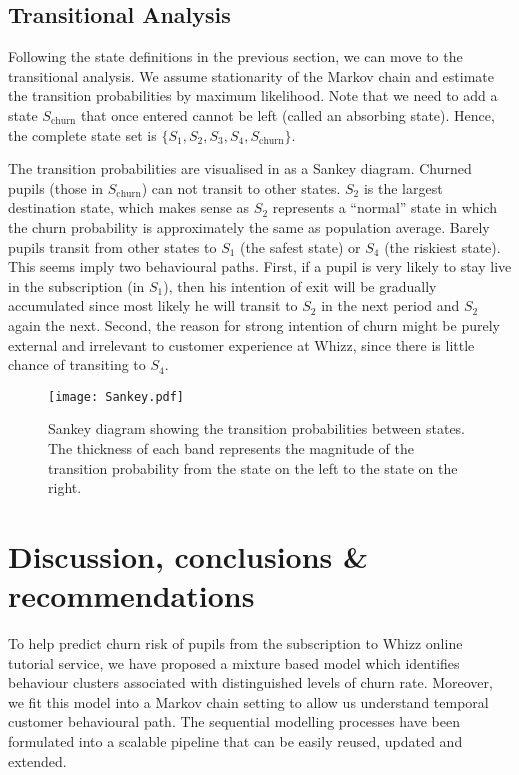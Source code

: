 \documentclass[english,a4,oneside,9pt]{extarticle}
\begin{document}
\subsection*{Transitional Analysis}

Following the state definitions in the previous section, we can move to the transitional analysis. We assume stationarity of the Markov chain and estimate the transition probabilities by maximum likelihood. Note that we need to add a state $S_\text{churn}$ that once entered cannot be left (called an absorbing state). Hence, the complete state set is $\{S_1, S_2, S_3, S_4, S_\text{churn}\}$.

The transition probabilities are visualised in  as a Sankey diagram. Churned pupils (those in $S_\text{churn}$) can not transit to other states. $S_2$ is the largest destination state, which makes sense as $S_2$ represents a ``normal'' state in which the churn probability is approximately the same as population average. Barely pupils transit from other states to $S_1$ (the safest state) or $S_4$ (the riskiest state). This seems imply two behavioural paths. First, if a pupil is very likely to stay live in the subscription (in $S_1$), then his intention of exit will be gradually accumulated since most likely he will transit to $S_2$ in the next period and $S_2$ again the next. Second, the reason for strong intention of churn might be purely external and irrelevant to customer experience at Whizz, since there is little chance of transiting to $S_4$.

\begin{figure}[htb]
\centering
\texttt{[image: Sankey.pdf]}
\caption{Sankey diagram showing the transition probabilities between states. The thickness of each band represents the magnitude of the transition probability from the state on the left to the state on the right.}
\label{fig:sankey}
\end{figure}

\vspace*{-3mm}
\section{Discussion, conclusions \& recommendations}

To help predict churn risk of pupils from the subscription to Whizz online tutorial service, we have proposed a mixture based model which identifies behaviour clusters associated with distinguished levels of churn rate. Moreover, we fit this model into a Markov chain setting to allow us understand temporal customer behavioural path. The sequential modelling processes have been formulated into a scalable pipeline that can be easily reused, updated and extended.
\end{document}
